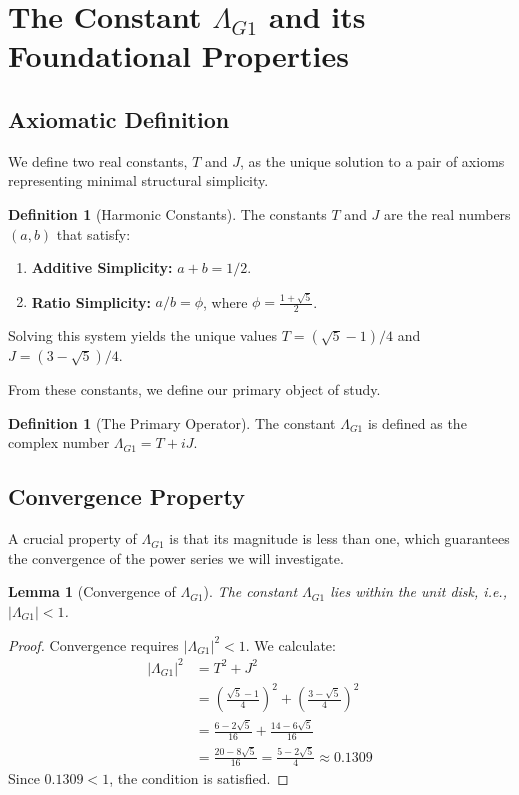 \documentclass{amsart}
\theoremstyle{plain}
\newtheorem{lemma}[theorem]{Lemma}
\theoremstyle{definition}
\newtheorem{definition}[theorem]{Definition}
\theoremstyle{remark}
\newcommand{\LambdaG}{\Lambda_{G1}}
\begin{document}
\section{The Constant \texorpdfstring{$\Lambda_{G1}$}{Lambda\_G1} and its Foundational Properties}

\subsection{Axiomatic Definition}
We define two real constants, $T$ and $J$, as the unique solution to a pair of axioms representing minimal structural simplicity.

\begin{definition}[Harmonic Constants]
The constants $T$ and $J$ are the real numbers $(a,b)$ that satisfy:
\begin{enumerate}
    \item \textbf{Additive Simplicity:} $a+b = 1/2$.
    \item \textbf{Ratio Simplicity:} $a/b = \phi$, where $\phi = \frac{1+\sqrt{5}}{2}$.
\end{enumerate}
Solving this system yields the unique values $T = (\sqrt{5}-1)/4$ and $J = (3-\sqrt{5})/4$.
\end{definition}

From these constants, we define our primary object of study.
\begin{definition}[The Primary Operator]
The constant $\LambdaG$ is defined as the complex number $\LambdaG = T+iJ$.
\end{definition}

\subsection{Convergence Property}
A crucial property of $\LambdaG$ is that its magnitude is less than one, which guarantees the convergence of the power series we will investigate.

\begin{lemma}[Convergence of $\LambdaG$]
\label{lem:convergence}
The constant $\LambdaG$ lies within the unit disk, i.e., $|\LambdaG| < 1$.
\end{lemma}
\begin{proof}
Convergence requires $|\LambdaG|^2 < 1$. We calculate:
\begin{align*}
    |\LambdaG|^2 &= T^2+J^2 \\
                 &= \left(\frac{\sqrt{5}-1}{4}\right)^2 + \left(\frac{3-\sqrt{5}}{4}\right)^2 \\
                 &= \frac{6-2\sqrt{5}}{16} + \frac{14-6\sqrt{5}}{16} \\
                 &= \frac{20-8\sqrt{5}}{16} = \frac{5-2\sqrt{5}}{4} \approx 0.1309
\end{align*}
Since $0.1309 < 1$, the condition is satisfied.
\end{proof}
\end{document}

